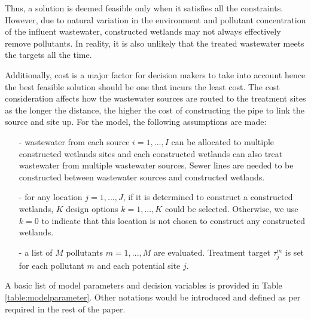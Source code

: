 \documentclass[preprint,12pt,authoryear]{elsarticle}
\begin{document}
Thus, a solution is deemed feasible only when it satisfies all the constraints. However, due to natural variation in the environment and pollutant concentration of the influent wastewater, constructed wetlands may not always effectively remove pollutants. In reality, it is also unlikely that the treated wastewater meets the targets all the time. 

Additionally, cost is a major factor for decision makers to take into account hence the best feasible solution should be one that incurs the least cost. The cost consideration affects how the wastewater sources are routed to the treatment sites as the longer the distance, the higher the cost of constructing the pipe to link the source and site up. For the model, the following assumptions are made:

\begin{itemize}
	\setlength{\itemsep}{0pt}
	\setlength{\parskip}{0pt}
	\setlength{\parsep}{0pt}
	\item[-] wastewater from each source $i=1,...,I$ can be allocated to multiple constructed wetlands sites and each constructed wetlands can also treat wastewater from multiple wastewater sources. Sewer lines are needed to be constructed between wastewater sources and constructed wetlands. 
	\item[-] for any location $j=1,...,J$, if it is determined to construct a constructed wetlands, $K$ design options $k=1,...,K$ could be selected. Otherwise, we use $k=0$ to indicate that this location is not chosen to construct any constructed wetlands. 
	\item[-] a list of $M$ pollutants $m=1,...,M$ are evaluated. Treatment target $\tau_j^m$ is set for each pollutant $m$ and each potential site $j$.
\end{itemize}

A basic list of model parameters and decision variables is provided in Table \ref{table:modelparameter}. Other notations would be introduced and defined as per required in the rest of the paper. 
\end{document}

